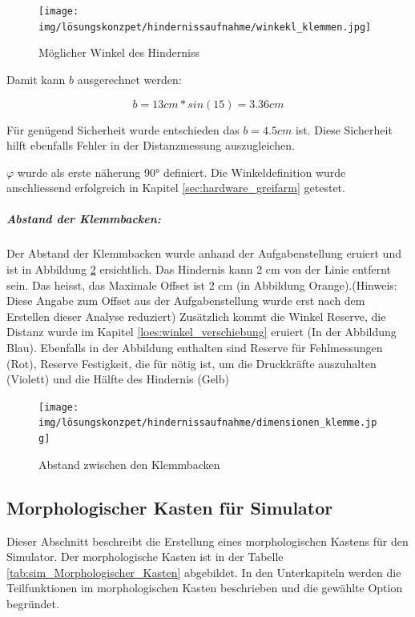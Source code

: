 \documentclass[../main.tex]{subfiles}
\begin{document}
\begin{figure}[H]
        \centering
        \texttt{[image: img/lösungskonzpet/hindernissaufnahme/winkekl\_klemmen.jpg]}
        \caption {Möglicher Winkel des Hinderniss}
        \label{img:loes_winkel_hinderniss}
\end{figure}

Damit kann $b$ ausgerechnet werden:

\[
b = 13cm * sin(15) = 3.36cm
\]

Für genügend Sicherheit wurde entschieden das $b = 4.5cm$ ist. Diese Sicherheit hilft ebenfalls Fehler in der Distanzmessung auszugleichen.

$\varphi$ wurde als erste näherung 90° definiert. Die Winkeldefinition wurde anschliessend erfolgreich in Kapitel \ref{sec:hardware_greifarm} getestet.

\newpage

\subparagraph{Abstand der Klemmbacken:} \label{loes:abstand_klemmen}
Der Abstand der Klemmbacken wurde anhand der Aufgabenstellung eruiert und ist in Abbildung \ref{img:loes_abstand_klemmen} ersichtlich. Das Hindernis kann 2 cm von der Linie entfernt sein. Das heisst, das Maximale Offset ist 2 cm (in Abbildung Orange).(Hinweis: Diese Angabe zum Offset aus der Aufgabenstellung wurde erst nach dem Erstellen dieser Analyse reduziert) Zusätzlich kommt die Winkel Reserve, die Distanz wurde im Kapitel \ref{loes:winkel_verschiebung} eruiert (In der Abbildung Blau). Ebenfalls in der Abbildung enthalten sind Reserve für Fehlmessungen (Rot), Reserve Festigkeit, die für nötig ist, um die Druckkräfte auszuhalten (Violett) und die Hälfte des Hindernis (Gelb)

\begin{figure}[H]
        \centering
        \texttt{[image: img/lösungskonzpet/hindernissaufnahme/dimensionen\_klemme.jpg]}
        \caption {Abstand zwischen den Klemmbacken}
        \label{img:loes_abstand_klemmen}
\end{figure}

\newpage
\subsection{Morphologischer Kasten für Simulator} \label{sec:sim_Morphologischer_Kasten}

Dieser Abschnitt beschreibt die Erstellung eines morphologischen Kastens für den Simulator. Der morphologische Kasten ist in der Tabelle \ref{tab:sim_Morphologischer_Kasten} abgebildet. In den Unterkapiteln werden die Teilfunktionen im morphologischen Kasten beschrieben und die gewählte Option begründet.  
\end{document}
